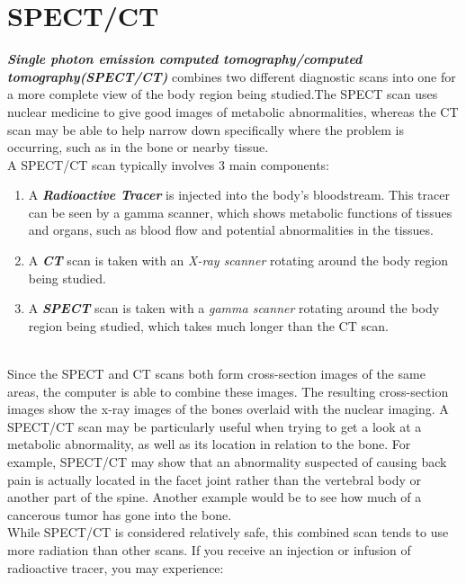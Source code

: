 \documentclass[12pt]{article}
\begin{document}
 \section{SPECT/CT}
\textbf{\emph{Single photon emission computed tomography/computed tomography\newline (SPECT/CT)}} combines two different diagnostic scans into one for a more complete view of the body region being studied.\newline The SPECT scan uses nuclear medicine to give good images of metabolic abnormalities, whereas the CT scan may be able to help narrow down specifically where the problem is occurring, such as in the bone or nearby tissue.\newline\\
A SPECT/CT scan typically involves 3 main components:
\begin{enumerate}
\item A \textbf{\emph{Radioactive Tracer}} is injected into the body’s bloodstream. This tracer can be seen by a gamma scanner, which shows metabolic functions of tissues and organs, such as blood flow and potential abnormalities in the tissues.
\item A \textbf{\emph{CT}} scan is taken with an \emph{ X-ray scanner} rotating around the body region being studied.
\item A \textbf{\emph{SPECT }}scan is taken with a \emph{gamma scanner} rotating around the body region being studied, which takes much longer than the CT scan.
\end{enumerate}\\
Since the SPECT and CT scans both form cross-section images of the same areas, the computer is able to combine these images. The resulting cross-section images show the x-ray images of the bones overlaid with the nuclear imaging.\newline 
A SPECT/CT scan may be particularly useful when trying to get a look at a metabolic abnormality, as well as its location in relation to the bone. For example, SPECT/CT may show that an abnormality suspected of causing back pain is actually located in the facet joint rather than the vertebral body or another part of the spine. Another example would be to see how much of a cancerous tumor has gone into the bone.\newline \\
While SPECT/CT is considered relatively safe, this combined scan tends to use more radiation than other scans.\newline 
 If you receive an injection or infusion of radioactive tracer, you may experience:
\end{document}
